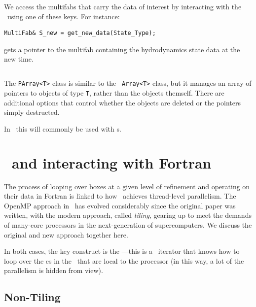 We access the multifabs that carry the data of interest by interacting
with the \statedata\ using one of these keys.  For instance:
\begin{lstlisting}
MultiFab& S_new = get_new_data(State_Type);
\end{lstlisting}
gets a pointer to the multifab containing the hydrodynamics state data
at the new time.



\subsection{\code{\parray}}

The {\tt PArray<T>} class is similar to the \cpp\ {\tt Array<T>} class,
but it manages an array of pointers to objects of type {\tt T}, rather
than the objects themself.  There are additional options that control
whether the objects are deleted or the pointers simply destructed.

In \castro\, this will commonly be used with \multifab s.


\section{\mfiter\ and interacting with Fortran}

The process of looping over boxes at a given level of refinement and
operating on their data in Fortran is linked to how \castro\ achieves
thread-level parallelism.  The OpenMP approach in \castro\ has evolved
considerably since the original paper was written, with the modern
approach, called {\em tiling}, gearing up to meet the demands of
many-core processors in the next-generation of supercomputers.  We
discuss the original and new approach together here.

In both cases, the key construct is the \code{\mfiter}---this is a
\cpp\ iterator that knows how to loop over the \farraybox es in the
\multifab\ that are local to the processor (in this way, a lot of the
parallelism is hidden from view).

\subsection{Non-Tiling \mfiter}

